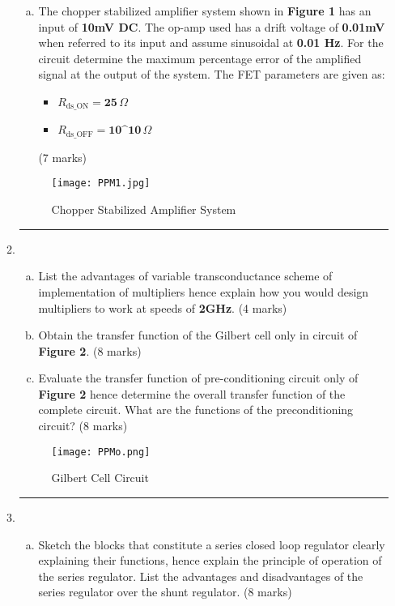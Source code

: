 \documentclass[a4paper,9pt,twoside,openany,twocolumn]{memoir}
\begin{document}
\begin{enumerate}
\begin{enumerate}
\begin{enumerate}[(a)]
        \item The chopper stabilized amplifier system shown in \textbf{Figure 1} has an input of \textbf{10mV DC}. The op-amp used has a drift voltage of \textbf{0.01mV} when referred to its input and assume sinusoidal at \textbf{0.01 Hz}. For the circuit determine the maximum percentage error of the amplified signal at the output of the system. The FET parameters are given as:
\begin{itemize}
    \item \( R_{\text{ds\_ON}} = \textbf{25} \, \Omega \)
    \item \( R_{\text{ds\_OFF}} = \textbf{10^{10}} \, \Omega \)
\end{itemize}
 \hfill{(7 marks)}
    \end{enumerate}

\begin{figure}[h!]
    \centering
    \texttt{[image: PPM1.jpg]}
    \caption{Chopper Stabilized Amplifier System}
\end{figure}
\begin{center}\rule{0.5\linewidth}{0.5pt}\end{center} 
\item
    \begin{enumerate}[(a)]
        \item List the advantages of variable transconductance scheme of implementation of multipliers hence explain how you would design multipliers to work at speeds of \textbf{2GHz}. \hfill{(4 marks)}

        \item Obtain the transfer function of the Gilbert cell only in circuit of \textbf{Figure 2}. \hfill{(8 marks)}

        \item Evaluate the transfer function of pre-conditioning circuit only of \textbf{Figure 2} hence determine the overall transfer function of the complete circuit. What are the functions of the preconditioning circuit? \hfill{(8 marks)}
    \end{enumerate}

\begin{figure}[h!]
    \centering
    \texttt{[image: PPMo.png]}
    \caption{Gilbert Cell Circuit}
\end{figure}
\begin{center}\rule{0.5\linewidth}{0.5pt}\end{center} 
\item
    \begin{enumerate}[(a)]
        \item Sketch the blocks that constitute a series closed loop regulator clearly explaining their functions, hence explain the principle of operation of the series regulator. List the advantages and disadvantages of the series regulator over the shunt regulator. \hfill{(8 marks)}


\end{enumerate}
\end{enumerate}
\end{enumerate}
\end{document}

